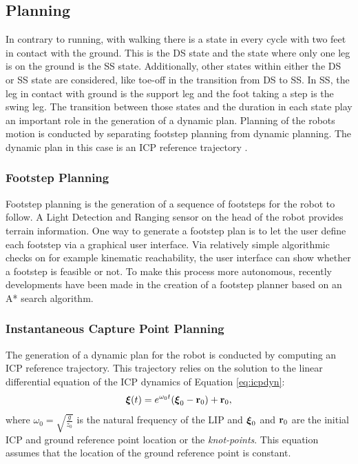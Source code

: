 \subsection{Planning}
In contrary to running, with walking there is a state in every cycle with two feet in contact with the ground. This is the \ac{DS} state and the state where only one leg is on the ground is the \ac{SS} state. Additionally, other states within either the \ac{DS} or \ac{SS} state are considered, like toe-off in the transition from \ac{DS} to \ac{SS}. In \ac{SS}, the leg in contact with ground is the support leg and the foot taking a step is the swing leg. The transition between those states and the duration in each state play an important role in the generation of a dynamic plan. Planning of the robots motion is conducted by separating footstep planning from dynamic planning. The dynamic plan in this case is an \ac{ICP} reference trajectory \cite{seyde2018inclusion}.
\subsubsection{Footstep Planning}
Footstep planning is the generation of a sequence of footsteps for the robot to follow. A Light Detection and Ranging sensor on the head of the robot provides terrain information. One way to generate a footstep plan is to let the user define each footstep via a graphical user interface. Via relatively simple algorithmic checks on for example kinematic reachability, the user interface can show whether a footstep is feasible or not. To make this process more autonomous, recently developments have been made in the creation of a footstep planner based on an A* search algorithm. 
\subsubsection{Instantaneous Capture Point Planning}\label{subsec:icpplan} 
The generation of a dynamic plan for the robot is conducted by computing an \ac{ICP} reference trajectory. This trajectory relies on the solution to the linear differential equation of the \ac{ICP} dynamics of Equation \eqref{eq:icpdyn}:
\begin{equation}\label{eq:icpsol}
	\boldsymbol{\xi}(t)=e^{\omega_0t}(\boldsymbol{\xi}_0- \mathbf{r}_0) + \mathbf{r}_0,
\end{equation}
where $\omega_0=\sqrt{\frac{g}{z_0}}$ is the natural frequency of the \ac{LIP} and $\boldsymbol{\xi}_0$ and $\mathbf{r}_0$ are the initial \ac{ICP} and ground reference point location or the \textit{knot-points}. This equation assumes that the location of the ground reference point is constant. 

